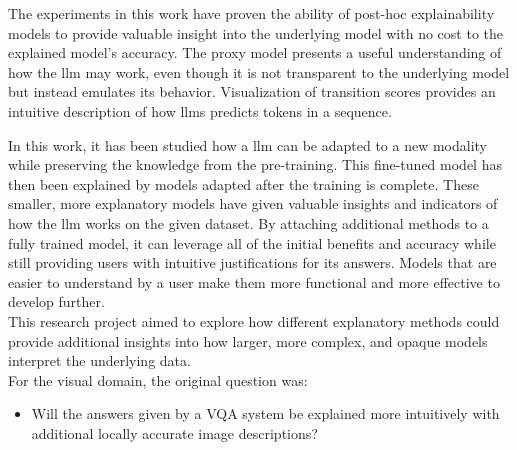     The experiments in this work have proven the ability of post-hoc explainability models to provide valuable insight into the underlying model with no cost to the explained model's accuracy. 
    The proxy model presents a useful understanding of how the \gls{llm} may work, even though it is not transparent to the underlying model but instead emulates its behavior. Visualization of transition scores provides an intuitive description of how \glspl{llm} predicts tokens in a sequence.  

    In this work, it has been studied how a \gls{llm} can be adapted to a new modality while preserving the knowledge from the pre-training.
    This fine-tuned model has then been explained by models adapted after the training is complete. These smaller, more explanatory models have given valuable insights and indicators of how the \gls{llm} works on the given dataset. 
    By attaching additional methods to a fully trained model, it can leverage all of the initial benefits and accuracy while still providing users with intuitive justifications for its answers. Models that are easier to understand by a user make them more functional and more effective to develop further.\\

   



    
This research project aimed to explore how different explanatory methods could provide additional insights into how larger, more complex, and opaque models interpret the underlying data.\\
For the visual domain, the original question was:
\begin{itemize}
    \item Will the answers given by a VQA system be explained more intuitively with additional locally accurate image descriptions?
\end{itemize}

